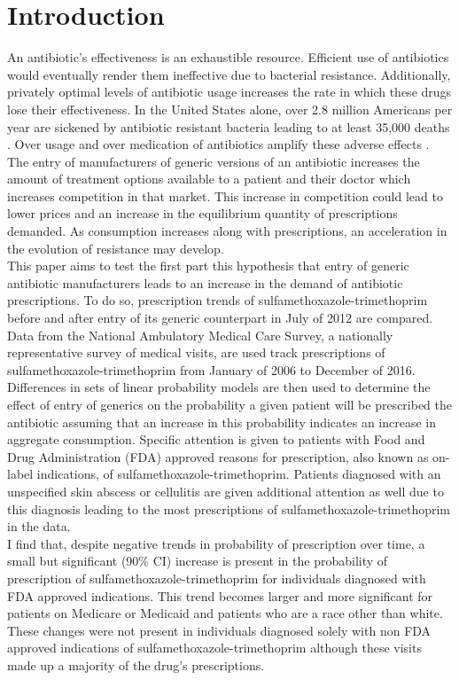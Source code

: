 \chapter{Introduction}
An antibiotic's effectiveness is an exhaustible resource. Efficient use of antibiotics would eventually render them ineffective due to bacterial resistance. Additionally, privately optimal levels of antibiotic usage increases the rate in which these drugs lose their effectiveness. In the United States alone, over 2.8 million Americans per year are sickened by antibiotic resistant bacteria leading to at least 35,000 deaths \cite{centers_for_disease_control_and_prevention_us_antibiotic_2019}. Over usage and over medication of antibiotics amplify these adverse effects \cite{gerber_outpatient_2019}.\\
\indent The entry of manufacturers of generic versions of an antibiotic increases the amount of treatment options available to a patient and their doctor which increases competition in that market. This increase in competition could lead to lower prices and an increase in the equilibrium quantity of prescriptions demanded. As consumption increases along with prescriptions, an acceleration in the evolution of resistance may develop.\\
\indent This paper aims to test the first part this hypothesis that entry of generic antibiotic manufacturers leads to an increase in the demand of antibiotic prescriptions. To do so, prescription trends of sulfamethoxazole-trimethoprim before and after entry of its generic counterpart in July of 2012 are compared. Data from the National Ambulatory Medical Care Survey, a nationally representative survey of medical visits, are used track prescriptions of sulfamethoxazole-trimethoprim from January of 2006 to December of 2016. Differences in sets of linear probability models are then used to determine the effect of entry of generics on the probability a given patient will be prescribed the antibiotic assuming that an increase in this probability indicates an increase in aggregate consumption. Specific attention is given to patients with Food and Drug Administration (FDA) approved reasons for prescription, also known as on-label indications, of sulfamethoxazole-trimethoprim. Patients diagnosed with an unspecified skin abscess or cellulitis are given additional attention as well due to this diagnosis leading to the most prescriptions of sulfamethoxazole-trimethoprim in the data.\\
\indent I find that, despite negative trends in probability of prescription over time, a small but significant (90\% CI) increase is present in the probability of prescription of sulfamethoxazole-trimethoprim for individuals diagnosed with FDA approved indications. This trend becomes larger and more significant for patients on Medicare or Medicaid and patients who are a race other than white. These changes were not present in individuals diagnosed solely with non FDA approved indications of sulfamethoxazole-trimethoprim although these visits made up a majority of the drug's prescriptions.\\

